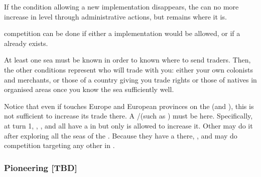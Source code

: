 \aparag If the condition allowing a new implementation disappears, the
\TradeFLEET can no more increase in level through administrative actions, but
remains where it is.

 \TradeFLEET competition can be done if
either a \TradeFLEET implementation would be allowed, or if a \TradeFLEET
already exists.

\begin{designnote}
  At least one sea must be known in order to known where to send
  traders. Then, the other conditions represent who will trade with you:
  either your own colonists and merchants, or those of a country giving you
  trade rights or those of natives in organised areas once you know the sea
  sufficiently well.
\end{designnote}

\begin{exemple}
  Notice that even if  touches Europe and European provinces on
  the \ROTW (\provinceAcores and ), this is not
  sufficient to increase its trade there. A \COL/\TP (such as ) must be here. Specifically, at turn 1, \ANG, \FRA, \HIS and \POR
  all have a \TradeFLEET in  but only \POR is allowed to
  increase it. Other may do it after exploring all the seas of the
  \STZ. Because they have a \TradeFLEET there, \ANG, \FRA and \HIS may do
  competition targeting any other \TradeFLEET in .
\end{exemple}


\subsubsection{Pioneering [TBD]}\label{chAdministration:Pioneering}

